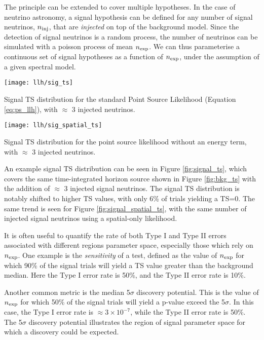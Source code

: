 The principle can be extended to cover multiple hypotheses. In the case of neutrino astronomy, a signal hypothesis can be defined for any number of signal neutrinos, $n_{\textup{inj}}$, that are \emph{injected} on top of the background model. Since the detection of signal neutrinos is a random process, the number of neutrinos can be simulated with a poisson process of mean $n_{\textup{exp}}$. We can thus parameterise a continuous set of signal hypotheses as a function of $n_{\textup{exp}}$, under the assumption of a given spectral model. 

\begin{marginfigure}
	\centering \texttt{[image: llh/sig\_ts]}
	\caption{Signal TS distribution for the standard Point Source Likelihood (Equation \ref{eq:ps_llh}), with $\approx$ 3 injected neutrinos.}
	\label{fig:signal_ts}
\end{marginfigure}

\begin{marginfigure}
	\centering \texttt{[image: llh/sig\_spatial\_ts]}
	\caption{Signal TS distribution for the point source likelihood without an energy term, with $\approx$ 3 injected neutrinos.}
	\label{fig:signal_spatial_ts}
\end{marginfigure}

An example signal TS distribution can be seen in Figure \ref{fig:signal_ts}, which covers the same time-integrated horizon source shown in Figure \ref{fig:bkg_ts} with the addition of $\approx$ 3 injected signal neutrinos. The signal TS distribution is notably shifted to higher TS values, with only 6\% of trials yielding a TS=0. The same trend is seen for Figure \ref{fig:signal_spatial_ts}, with the same number of injected signal neutrinos using a spatial-only likelihood.

It is often useful to quantify the rate of both Type  I and Type II errors associated with different regions parameter space, especially those which rely on $n_{\textup{exp}}$. One example is the \emph{sensitivity} of a test, defined as the value of $n_{\textup{exp}}$ for which 90\% of the signal trials will yield a TS value greater than the background median. Here the Type I error rate is 50\%, and the Type II error rate is 10\%. 

Another common metric is the median 5$\sigma$ discovery potential. This is the value of $n_{\textup{exp}}$ for which 50\% of the signal trials will yield a p-value exceed the 5$\sigma$. In this case, the Type I error rate is $\approx 3 \times 10^{-7}$, while the Type II error rate is 50\%. The 5$\sigma$ discovery potential illustrates the region of signal parameter space for which a discovery could be expected. 

